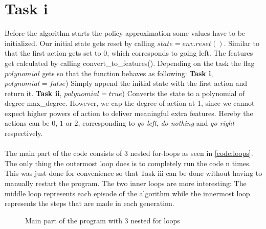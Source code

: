\documentclass{article}
\begin{document}
	\section{Task i}
	\label{sec:Taski}
	Before the algorithm starts the policy approximation some values have to be initialized. Our initial state gets reset by calling $state = env.reset()$. Similar to that the first action gets set to $0$, which corresponds to going left. The features get calculated by calling convert\_to\_features(). Depending on the task the flag $polynomial$ gets so that the function behaves as following: \textbf{Task i}, $polynomial = false$) Simply append the initial state with the first action and return it. \textbf{Task ii}, $polynomial = true$) Converts the state to a polynomial of degree max\_degree. However, we cap the degree of action at 1, since we cannot expect higher powers of action to deliver meaningful extra features. Hereby the actions can be $0$, $1$ or $2$, corresponding to \textit{go left}, \textit{do nothing} and \textit{go right} respectively.\\
	\\
	The main part of the code consists of 3 nested for-loops as seen in \autoref{code:loops}. The only thing the outermost loop does is to completely run the code n times. This was just done for convenience so that Task iii can be done without having to manually restart the program. The two inner loops are more interesting: The middle loop represents each episode of the algorithm while the innermost loop represents the steps that are made in each generation. 
	
	\begin{figure}
		\caption{Main part of the program with 3 nested for loops}
		\label{code:loops}
		
	\end{figure}
	
	\FloatBarrier
	
\end{document}
